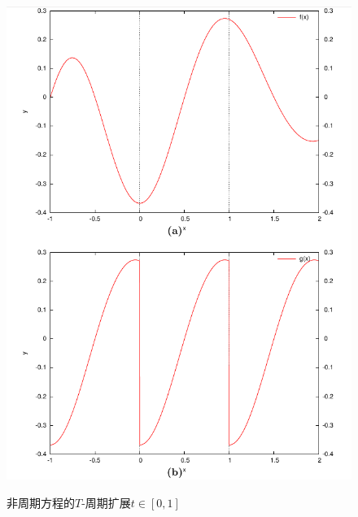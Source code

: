 \begin{figure}[htbp]
   \caption{非周期方程的$T$-周期扩展$t \in [0,1]$}
  \centering
  \includegraphics[width=12cm]{./Figures/20180306-fourier-period-extension.png}
  \label{fig:ninc-cc-trape-extension-convergence}
%
\end{figure}

